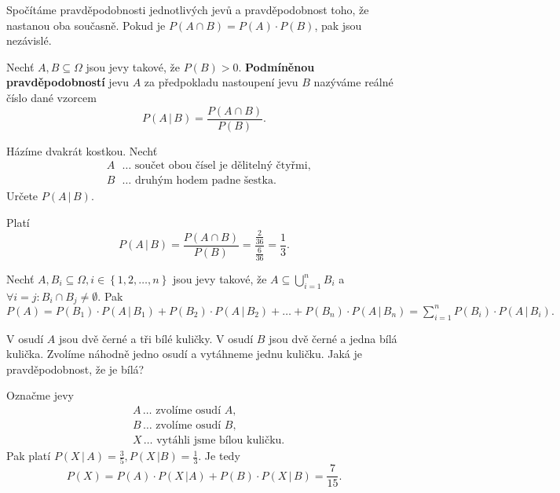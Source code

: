 \begin{reseni}
Spočítáme pravděpodobnosti jednotlivých jevů a pravděpodobnost toho, že nastanou
oba současně. Pokud je $P(A\cap B)=P(A)\cdot P(B)$, pak jsou nezávislé.
\end{reseni}

\begin{definition}
    Nechť $A,B\subseteq \Omega$ jsou jevy takové, že $P(B)>0.$ \textbf{Podmíněnou
    pravděpodobností} jevu $A$ za předpokladu nastoupení jevu $B$ nazýváme reálné
    číslo dané vzorcem
    $$P(A\, | \, B) = \frac{P(A\cap B)}{P(B)}.$$
\end{definition}

\begin{priklad}
Házíme dvakrát kostkou. Nechť
\begin{align*}
    &A \textrm{ } \dots  \textrm{ součet obou čísel je dělitelný čtyřmi,}\\
    &B \textrm{ } \dots  \textrm{ druhým hodem padne šestka}.
\end{align*}
Určete $P(A\, |\, B).$
\end{priklad}

\begin{reseni}
Platí
$$P(A\, |\, B)=\frac{P(A\cap B)}{P(B)}=\frac{\frac{2}{36}}{\frac{6}{36}}=\frac{1}{3}.$$
\end{reseni}

\begin{veta}
    Nechť $A,B_i \subseteq \Omega, i \in \left \{ 1, 2, \dots, n \right \} $ jsou jevy
    takové, že $A\subseteq \bigcup_{i=1}^n B_i$ a $\forall i= j: B_i\cap B_j\ne
    \emptyset.$ Pak $P(A)=P(B_1)\cdot P(A\, |\, B_1) + P(B_2)\cdot P(A \, |\, B_2)+
    \dots + P(B_n)\cdot P(A \,|\, B_n)=\sum_{i=1}^n P(B_i)\cdot P(A\, |\, B_i).$
\end{veta}

\begin{priklad}
V osudí $A$ jsou dvě černé a tři bílé kuličky. V osudí $B$ jsou dvě černé a jedna
bílá kulička. Zvolíme náhodně jedno osudí a vytáhneme jednu kuličku. Jaká
je pravděpodobnost, že je bílá?
\end{priklad}

\begin{reseni}
Označme jevy
\begin{align*}
    &A \,\dots  \textrm{ zvolíme osudí } A,\\
    &B\,\dots  \textrm{ zvolíme osudí } B,\\
    &X\,\dots  \textrm{ vytáhli jsme bílou kuličku}.
\end{align*}
Pak platí
$P(X \, | \, A) = \frac{3}{5}, P(X \, | B)=\frac{1}{3}.$ Je tedy
$$P(X)=P(A)\cdot P(X \, | A)+P(B)\cdot P(X\, | \, B)=\frac{7}{15}.$$
\end{reseni}

